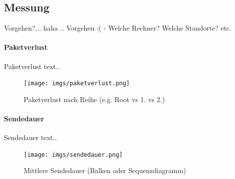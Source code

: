 \documentclass[paper=a4, fontsize=11pt]{scrartcl} %
\numberwithin{equation}{section} %
\numberwithin{figure}{section} %
\numberwithin{table}{section} %
\begin{document}
\subsection{Messung}

Vorgehen?... haha .. Vorgehen :( - Welche Rechner? Welche Standorte? etc.

\paragraph{Paketverlust}

Paketverlust text..

\begin{figure}[H]
  \centering
  \texttt{[image: imgs/paketverlust.png]}
  \caption{Paketverlust nach Reihe (e.g. Root vs 1. vs 2.)}
  \label{fig:paketverlust}
\end{figure}

\paragraph{Sendedauer}

Sendedauer text..

\begin{figure}[H]
  \centering
  \texttt{[image: imgs/sendedauer.png]}
  \caption{Mittlere Sendedauer (Balken oder Sequenzdiagramm)}
  \label{fig:sendedauer}
\end{figure}
\end{document}
